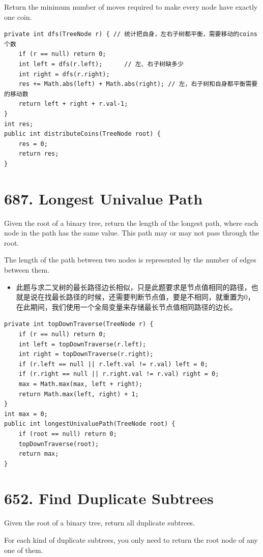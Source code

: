 \documentclass[9pt, b5paaper]{book}
\begin{document}
Return the minimum number of moves required to make every node have exactly one coin.
\begin{verbatim}
private int dfs(TreeNode r) { // 统计把自身，左右子树都平衡，需要移动的coins个数
    if (r == null) return 0;
    int left = dfs(r.left);      // 左、右子树缺多少
    int right = dfs(r.right);
    res += Math.abs(left) + Math.abs(right); // 左，右子树和自身都平衡需要的移动数
    return left + right + r.val-1;
}
int res;
public int distributeCoins(TreeNode root) {
    res = 0;
    return res;
}
\end{verbatim}

\section{687. Longest Univalue Path}
\label{sec-4-2}
Given the root of a binary tree, return the length of the longest path, where each node in the path has the same value. This path may or may not pass through the root.

The length of the path between two nodes is represented by the number of edges between them.
\begin{itemize}
\item 此题与求二叉树的最长路径边长相似，只是此题要求是节点值相同的路径，也就是说在找最长路径的时候，还需要判断节点值，要是不相同，就重置为0，在此期间，我们使用一个全局变量来存储最长节点值相同路径的边长。
\end{itemize}
\begin{verbatim}
private int topDownTraverse(TreeNode r) { 
    if (r == null) return 0;
    int left = topDownTraverse(r.left);
    int right = topDownTraverse(r.right);
    if (r.left == null || r.left.val != r.val) left = 0;
    if (r.right == null || r.right.val != r.val) right = 0;
    max = Math.max(max, left + right);
    return Math.max(left, right) + 1;
}
int max = 0;
public int longestUnivaluePath(TreeNode root) {
    if (root == null) return 0;
    topDownTraverse(root);
    return max;
}
\end{verbatim}

\section{652. Find Duplicate Subtrees}
\label{sec-4-3}
Given the root of a binary tree, return all duplicate subtrees.

For each kind of duplicate subtrees, you only need to return the root node of any one of them.
\end{document}
